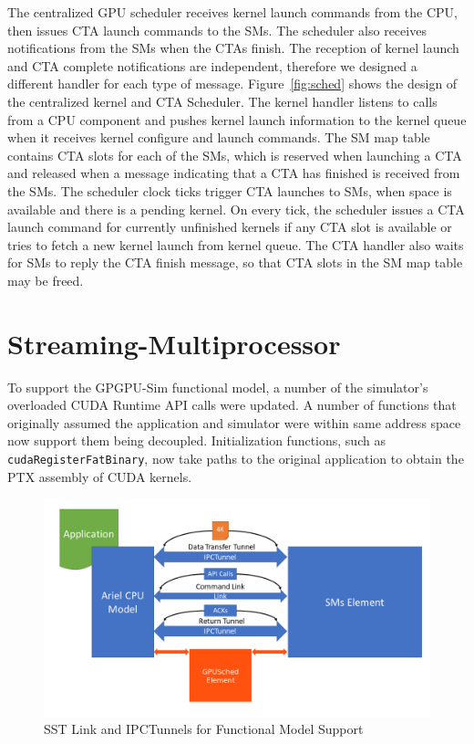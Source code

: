 The centralized GPU scheduler receives kernel launch commands from the CPU, then
issues CTA launch commands to the SMs. The scheduler also receives notifications
from the SMs when the CTAs finish. The reception of kernel launch and CTA
complete notifications are independent, therefore we designed a different
handler for each type of message. Figure~\ref{fig:sched} shows the design of the
centralized kernel and CTA Scheduler. The kernel handler listens to calls from a
CPU component and pushes kernel launch information to the kernel queue when it
receives kernel configure and launch commands. The SM map table contains CTA
slots for each of the SMs, which is reserved when launching a CTA and released when a
message indicating that a CTA has finished is received from the SMs. The
scheduler clock ticks trigger CTA launches to SMs, when space is available and
there is a pending kernel. On every tick, the scheduler issues a CTA launch
command for currently unfinished kernels if any CTA slot is available or tries
to fetch a new kernel launch from kernel queue. The CTA handler also waits for
SMs to reply the CTA finish message, so that CTA slots in the SM map table may
be freed.


\section{Streaming-Multiprocessor}
\label{sec:sms}
To support the GPGPU-Sim functional model, a number of the simulator's overloaded
CUDA Runtime API calls were updated. A number of functions that originally assumed
the application and simulator were within same address space now support them being
decoupled. Initialization functions, such as \texttt{\textunderscore \textunderscore
cudaRegisterFatBinary}, now take paths to the original application to obtain the PTX
assembly of CUDA kernels.

   \begin{figure}[!htb]
      \centering
      \setlength{\abovecaptionskip}{6pt plus 1pt minus 1pt}
      \includegraphics[width=.90\textwidth,keepaspectratio]{figures/transfer_flow.png}
      \captionsetup{format=hang, justification=centering, width=.75\textwidth}
      \caption{SST Link and IPCTunnels for Functional Model Support}
      \label{fig:gpu_transfer_model}
   \end{figure}


